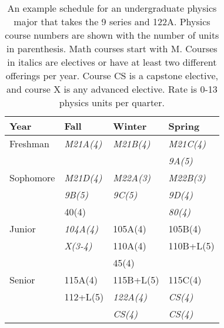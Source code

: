 \documentclass[12pt]{article}
\begin{document}
\begin{table}
\caption{
An example schedule for an undergraduate physics major that takes the 9 series and 122A. Physics course numbers are shown with the number of units in parenthesis.  Math courses start with M.  Courses in italics are electives or have at least two different offerings per year. Course CS is a capstone elective, and course X is any advanced elective.  Rate is 0-13 physics units per quarter.}
\label{tbl:proposed-nonhonors}
\begin{center}
\begin{tabular}{|l|l|l|l|}
\hline
Year      & Fall    & Winter & Spring \\
\hline
Freshman  & {\it M21A(4)}  & {\it M21B(4)}  & {\it M21C(4)}\\
          &               &               & {\it 9A(5)} \\
\hline
Sophomore & {\it M21D(4)}  & {\it M22A(3)}  & {\it M22B(3)}\\ 
          & {\it 9B(5)}    & {\it 9C(5)}    & {\it 9D(4)} \\
          & 40(4)          &                & {\it 80(4)} \\
\hline
Junior   & {\it 104A(4)}   & 105A(4)       & 105B(4) \\
         & {\it X(3-4)}      & 110A(4)       & 110B+L(5) \\         
         &                 & 45(4)         & \\

\hline
Senior   & 115A(4)    & 115B+L(5)      & 115C(4) \\
         & 112+L(5)   & {\it 122A(4)} & {\it CS(4)} \\
         &            & {\it CS(4)}   & {\it CS(4)}  \\
\hline 
\end{tabular}
\end{center}
\end{table}
\end{document}

